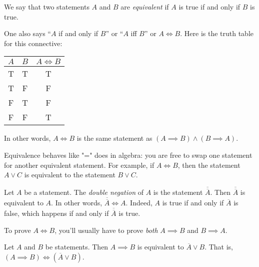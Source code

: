 \documentclass[11pt,dvipsnames]{book}
\numberwithin{figure}{section} %
\numberwithin{table}{section} %
\begin{document}
\begin{definition}
    We say that two statements $A$ and $B$ are \emph{equivalent} if $A$ is true if and only if $B$ is true.
\end{definition}

One also says ``$A$ if and only if $B$'' or ``$A$ iff $B$'' or $A \iff B$.
Here is the truth table for this connective:
\begin{center}
    \begin{tabular}{ c|c|c}
        $A$ & $B$ & $A \iff B$  \\ \hline
        T & T & T \\
        T & F & F \\
        F & T & F \\
        F & F & T \\
    \end{tabular}
\end{center}

In other words, $A \iff B$ is the same statement as $(A\implies B) \wedge (B \implies A)$.

Equivalence behaves like "=" does in algebra: you are free to swap one statement for another equivalent statement.
For example, if $A\iff B$, then the statement $A \vee C$ is equivalent to the statement $B \vee C$.

\begin{example}
Let $A$ be a statement.
The \emph{double negation} of $A$ is the statement $\overline{\overline{A}}$.
Then $\overline{\overline{A}}$ is equivalent to $A$.
In other words, $\overline{\overline{A}} \iff A$.
Indeed, $A$ is true if and only if $\overline{A}$ is false, which happens if and only if $\overline{\overline{A}}$ is true.
\end{example}

To prove $A\iff B$, you'll usually have to prove \emph{both} $A\implies B$ and $B\implies A$.

\begin{theorem}
Let $A$ and $B$ be statements.
Then $A \implies B$ is equivalent to $\overline{A} \vee B$.
That is, $(A \implies B) \iff (\overline{A} \vee B)$.
\end{theorem}
\end{document}

